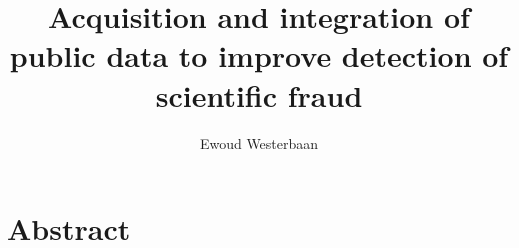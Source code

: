 \documentclass{ou-report}
\begin{document}
\pagestyle{plain}
\title{Acquisition and integration of public data to improve detection of scientific fraud}
\author{Ewoud Westerbaan}
%



\frontmatter 


\let\cleardoublepage\clearpage

%

%
\tableofcontents



%
%

\mainmatter
{}


\newcommand{\mi}[1]{\ensuremath{\mathit{#1}}}
\newcommand{\authors}{\mi{authors}}
\newcommand{\cites}{\mi{cites}}
\newcommand{\receives}{\mi{receives}}
\newcommand{\reviews}{\mi{reviews}}
\newcommand{\accepts}{\mi{accepts}}
\newcommand{\rejects}{\mi{rejects}}
\newcommand{\editorinchief}{\mi{EiC}}
\newcommand{\associateeditor}{\mi{AE}}
\newcommand{\Humans}{\mi{People}}
\newcommand{\Reviewers}{\mi{Reviewers}}
\newcommand{\Editors}{\mi{Editors}}


\chapter*{Abstract}
\end{document}
